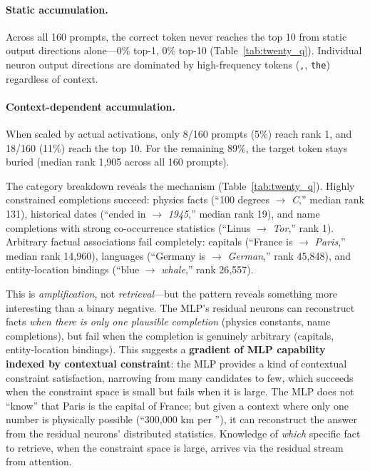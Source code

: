 \documentclass{article}
\begin{document}
\paragraph{Static accumulation.}
Across all 160 prompts, the correct token never reaches the top 10 from
static output directions alone---0\% top-1, 0\% top-10
(Table~\ref{tab:twenty_q}).
Individual neuron output directions are dominated by high-frequency tokens
(\texttt{,}, \texttt{the}) regardless of context.

\paragraph{Context-dependent accumulation.}
When scaled by actual activations, only 8/160 prompts (5\%) reach rank 1,
and 18/160 (11\%) reach the top 10.
For the remaining 89\%, the target token stays buried (median rank 1{,}905
across all 160 prompts).

The category breakdown reveals the mechanism (Table~\ref{tab:twenty_q}).
Highly constrained completions succeed: physics facts (``100 degrees $\to$
\emph{C},'' median rank 131), historical dates (``ended in $\to$
\emph{1945},'' median rank 19), and name completions with strong
co-occurrence statistics (``Linus $\to$ \emph{Tor},'' rank 1).
Arbitrary factual associations fail completely: capitals (``France is $\to$
\emph{Paris},'' median rank 14{,}960), languages (``Germany is $\to$
\emph{German},'' rank 45{,}848), and entity-location bindings
(``blue $\to$ \emph{whale},'' rank 26{,}557).

This is \emph{amplification}, not \emph{retrieval}---but the pattern reveals
something more interesting than a binary negative.
The MLP's residual neurons can reconstruct facts \emph{when there is only
one plausible completion} (physics constants, name completions), but fail
when the completion is genuinely arbitrary (capitals, entity-location bindings).
This suggests a \textbf{gradient of MLP capability indexed by contextual
constraint}: the MLP provides a kind of contextual constraint satisfaction,
narrowing from many candidates to few, which succeeds when the constraint
space is small but fails when it is large.
The MLP does not ``know'' that Paris is the capital of France; but given
a context where only one number is physically possible (``300,000 km per \underline{\hspace{0.5cm}}''),
it can reconstruct the answer from the residual neurons' distributed statistics.
Knowledge of \emph{which} specific fact to retrieve, when the constraint space
is large, arrives via the residual stream from attention.
\end{document}
